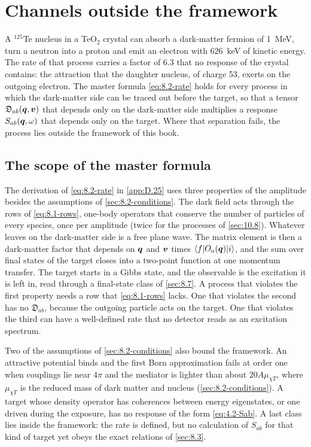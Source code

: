 \section{Channels outside the framework}\label{sec:22.3}

A $^{125}$Te nucleus in a TeO$_2$ crystal can absorb a dark-matter fermion of \SI{1}{MeV}, turn a neutron into a proton and emit an electron with \SI{626}{keV} of kinetic energy. The rate of that process carries a factor of 6.3 that no response of the crystal contains: the attraction that the daughter nucleus, of charge 53, exerts on the outgoing electron. The master formula \cref{eq:8.2-rate} holds for every process in which the dark-matter side can be traced out before the target, so that a tensor $\mathfrak{D}_{ab}(\bm{q}, \bm{v})$ that depends only on the dark-matter side multiplies a response $S_{ab}(\bm{q}, \omega)$ that depends only on the target. Where that separation fails, the process lies outside the framework of this book.

\subsection{The scope of the master formula}\label{sec:22.3-scope}

The derivation of \cref{eq:8.2-rate} in \cref{app:D.25} uses three properties of the amplitude besides the assumptions of \cref{sec:8.2-conditions}. The dark field acts through the rows of \cref{eq:8.1-rows}, one-body operators that conserve the number of particles of every species, once per amplitude (twice for the processes of \cref{sec:10.8}). Whatever leaves on the dark-matter side is a free plane wave. The matrix element is then a dark-matter factor that depends on $\bm{q}$ and $\bm{v}$ times $\langle f|O_a(\bm{q})|i\rangle$, and the sum over final states of the target closes into a two-point function at one momentum transfer. The target starts in a Gibbs state, and the observable is the excitation it is left in, read through a final-state class of \cref{sec:8.7}. A process that violates the first property needs a row that \cref{eq:8.1-rows} lacks. One that violates the second has no $\mathfrak{D}_{ab}$, because the outgoing particle acts on the target. One that violates the third can have a well-defined rate that no detector reads as an excitation spectrum.

Two of the assumptions of \cref{sec:8.2-conditions} also bound the framework. An attractive potential binds and the first Born approximation fails at order one when couplings lie near $4\pi$ and the mediator is lighter than about $20A\mu_{\chi T}$, where $\mu_{\chi T}$ is the reduced mass of dark matter and nucleus (\cref{sec:8.2-conditions}). A target whose density operator has coherences between energy eigenstates, or one driven during the exposure, has no response of the form \cref{eq:4.2-Sab}. A last class lies inside the framework: the rate is defined, but no calculation of $S_{ab}$ for that kind of target yet obeys the exact relations of \cref{sec:8.3}.

